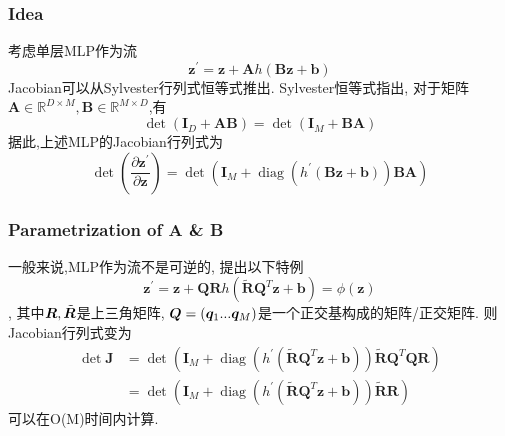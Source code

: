 \documentclass{article}
\begin{document}
\subsubsection{Idea}
考虑单层MLP作为流
\begin{equation}
    \mathbf{z}^{\prime}=\mathbf{z}+\mathbf{A} h(\mathbf{B} \mathbf{z}+\mathbf{b})
\end{equation}
Jacobian可以从Sylvester行列式恒等式推出. Sylvester恒等式指出, 对于矩阵$\mathbf{A} \in \mathbb{R}^{D \times M}, \mathbf{B} \in \mathbb{R}^{M \times D}$,有
\begin{equation}
    \operatorname{det}\left(\mathbf{I}_{D}+\mathbf{A} \mathbf{B}\right)=\operatorname{det}\left(\mathbf{I}_{M}+\mathbf{B A}\right)
\end{equation}
据此,上述MLP的Jacobian行列式为
\begin{equation}
    \operatorname{det}\left(\frac{\partial \mathbf{z}^{\prime}}{\partial \mathbf{z}}\right)=\operatorname{det}\left(\mathbf{I}_{M}+\operatorname{diag}\left(h^{\prime}(\mathbf{B} \mathbf{z}+\mathbf{b})\right) \mathbf{B} \mathbf{A}\right)
\end{equation}

\subsubsection{Parametrization of A \& B}
一般来说,MLP作为流不是可逆的, 提出以下特例
\begin{equation}
    \mathbf{z}^{\prime}=\mathbf{z}+\mathbf{Q} \mathbf{R} h\left(\tilde{\mathbf{R}} \mathbf{Q}^{T} \mathbf{z}+\mathbf{b}\right)=\phi(\mathbf{z})
\end{equation},
其中$\boldsymbol{R}, \tilde{\boldsymbol{R}}$是上三角矩阵, $\boldsymbol{Q}=(\boldsymbol{q}_1...\boldsymbol{q}_M)$是一个正交基构成的矩阵/正交矩阵. 则Jacobian行列式变为
\begin{equation}
    \begin{aligned}
    \operatorname{det} \mathbf{J} &=\operatorname{det}\left(\mathbf{I}_{M}+\operatorname{diag}\left(h^{\prime}\left(\tilde{\mathbf{R}} \mathbf{Q}^{T} \mathbf{z}+\mathbf{b}\right)\right) \tilde{\mathbf{R}} \mathbf{Q}^{T} \mathbf{Q} \mathbf{R}\right) \\
    &=\operatorname{det}\left(\mathbf{I}_{M}+\operatorname{diag}\left(h^{\prime}\left(\tilde{\mathbf{R}} \mathbf{Q}^{T} \mathbf{z}+\mathbf{b}\right)\right) \tilde{\mathbf{R}} \mathbf{R}\right)
    \end{aligned}
\end{equation}
可以在O(M)时间内计算.
\end{document}
